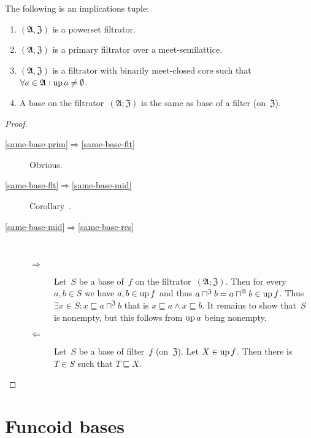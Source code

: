 \begin{prop}
The following is an implications tuple:
\begin{enumerate}
\item\label{same-base-prim} $(\mathfrak{A},\mathfrak{Z})$ is a powerset filtrator.
\item\label{same-base-flt} $(\mathfrak{A},\mathfrak{Z})$ is a primary filtrator over a meet-semilattice.
\item\label{same-base-mid} $(\mathfrak{A},\mathfrak{Z})$ is a filtrator with binarily meet-closed core such that
  $\forall a\in\mathfrak{A}:\operatorname{up} a\ne\emptyset$.
\item\label{same-base-res} A base on the filtrator~$(\mathfrak{A};\mathfrak{Z})$ is the same
as base of a filter (on~$\mathfrak{Z}$).
\end{enumerate}
\end{prop}

\begin{proof}
~
\begin{description}
\item[\ref{same-base-prim}$\Rightarrow$\ref{same-base-flt}] Obvious.

\item[\ref{same-base-flt}$\Rightarrow$\ref{same-base-mid}] Corollary~.

\item[\ref{same-base-mid}$\Rightarrow$\ref{same-base-res}] ~
  \begin{description}
  \item[$\Rightarrow$] Let~$S$ be a base of~$f$ on the filtrator~$(\mathfrak{A};\mathfrak{Z})$.
  Then for every $a,b\in S$ we have $a,b\in\operatorname{up} f$ and thus $a\sqcap^{\mathfrak{Z}}b=a\sqcap^{\mathfrak{A}}b\in\operatorname{up} f$.
  Thus $\exists x\in S:x\sqsubseteq a\sqcap^{\mathfrak{Z}}b$ that is $x\sqsubseteq a\land x\sqsubseteq b$.
  It remains to show that~$S$ is nonempty, but this follows from $\operatorname{up} a$ being nonempty.

  \item[$\Leftarrow$] Let~$S$ be a base of filter~$f$ (on~$\mathfrak{Z}$).
  Let $X\in\operatorname{up} f$. Then there is $T\in S$ such that $T\sqsubseteq X$.
  \end{description}
\end{description}
\end{proof}

\section{Funcoid bases}

